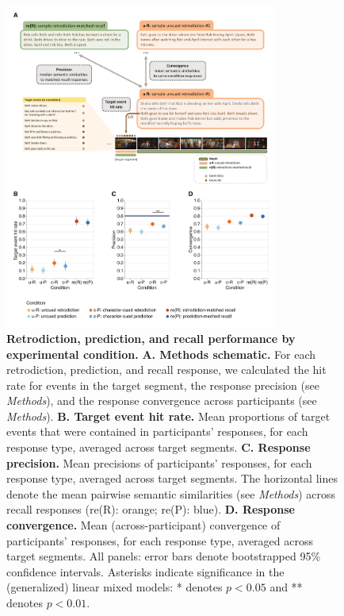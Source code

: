\documentclass[10pt]{article}
\begin{document}
\begin{figure}[tp]
  \centering
  \includegraphics[width=0.80\textwidth]{results1}
  \caption{\textbf{Retrodiction, prediction, and recall performance by experimental condition.} \textbf{A.  Methods schematic.}  For each retrodiction, prediction, and recall response, we calculated the hit rate for events in the target segment, the response precision (see \textit{Methods}), and the response convergence across participants (see \textit{Methods}).  \textbf{B. Target event hit rate.} Mean proportions of target events that were contained in participants' responses, for each response type, averaged across target segments.  \textbf{C. Response precision.}  Mean precisions of participants' responses, for each response type, averaged across target segments.  The horizontal lines denote the mean pairwise semantic similarities (see \textit{Methods}) across recall responses (re(R): orange; re(P): blue).  \textbf{D. Response convergence.}  Mean (across-participant) convergence of participants' responses, for each response type, averaged across target segments.  All panels: error bars denote bootstrapped 95\% confidence intervals.  Asterisks indicate significance in the (generalized) linear mixed models: * denotes $p < 0.05$ and ** denotes $p < 0.01$.}
  \label{fig:result1}
\end{figure}
 
\end{document}
